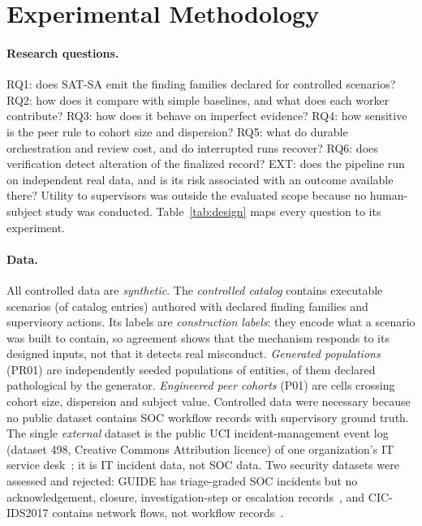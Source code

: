 \section{Experimental Methodology}
\label{sec:method}

\paragraph{Research questions.} RQ1: does SAT-SA emit the finding families declared
for controlled scenarios? RQ2: how does it compare with simple baselines, and what
does each worker contribute? RQ3: how does it behave on imperfect evidence? RQ4: how
sensitive is the peer rule to cohort size and dispersion? RQ5: what do durable
orchestration and review cost, and do interrupted runs recover? RQ6: does
verification detect alteration of the finalized record? EXT: does the pipeline run
on independent real data, and is its risk associated with an outcome available
there? Utility to supervisors was outside the evaluated scope because no
human-subject study was conducted. Table~\ref{tab:design} maps every question to
its experiment.



\paragraph{Data.} All controlled data are \emph{synthetic}. The \emph{controlled
catalog} contains  executable scenarios (of 
catalog entries) authored with declared finding families and supervisory actions.
Its labels are \emph{construction labels}: they encode what a scenario was built to
contain, so agreement shows that the mechanism responds to its designed inputs, not
that it detects real misconduct. \emph{Generated populations} (PR01) are
 independently seeded populations of  entities,
 of them declared pathological by the generator.
\emph{Engineered peer cohorts} (P01) are  cells crossing cohort size,
dispersion and subject value. Controlled data were necessary because no public dataset
contains SOC workflow records with supervisory ground truth. The single \emph{external}
dataset is the public UCI incident-management event log (dataset 498, Creative Commons Attribution licence) of one
organization's IT service desk~\cite{amaral2018uci498,amaral2019completion}; it is IT
incident data, not SOC data. Two security datasets were assessed and rejected: GUIDE
has triage-graded SOC incidents but no acknowledgement, closure, investigation-step or
escalation records~\cite{freitas2024guide}, and CIC-IDS2017 contains network flows,
not workflow records~\cite{sharafaldin2018cicids}.

